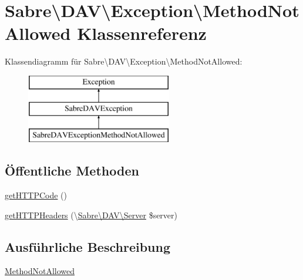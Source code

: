 \hypertarget{class_sabre_1_1_d_a_v_1_1_exception_1_1_method_not_allowed}{}\section{Sabre\textbackslash{}D\+AV\textbackslash{}Exception\textbackslash{}Method\+Not\+Allowed Klassenreferenz}
\label{class_sabre_1_1_d_a_v_1_1_exception_1_1_method_not_allowed}
Klassendiagramm für Sabre\textbackslash{}D\+AV\textbackslash{}Exception\textbackslash{}Method\+Not\+Allowed\+:\begin{figure}[H]
\begin{center}
\leavevmode
\includegraphics[height=3.000000cm]{class_sabre_1_1_d_a_v_1_1_exception_1_1_method_not_allowed}
\end{center}
\end{figure}
\subsection*{Öffentliche Methoden}
\begin{DoxyCompactItemize}
\item 
\mbox{\hyperlink{class_sabre_1_1_d_a_v_1_1_exception_1_1_method_not_allowed_abe1309963dbb7079d97afae46bd58a8f}{get\+H\+T\+T\+P\+Code}} ()
\item 
\mbox{\hyperlink{class_sabre_1_1_d_a_v_1_1_exception_1_1_method_not_allowed_aafbe8aba4665eac1c1784829e522eab8}{get\+H\+T\+T\+P\+Headers}} (\textbackslash{}\mbox{\hyperlink{class_sabre_1_1_d_a_v_1_1_server}{Sabre\textbackslash{}\+D\+A\+V\textbackslash{}\+Server}} \$server)
\end{DoxyCompactItemize}


\subsection{Ausführliche Beschreibung}
\mbox{\hyperlink{class_sabre_1_1_d_a_v_1_1_exception_1_1_method_not_allowed}{Method\+Not\+Allowed}}

